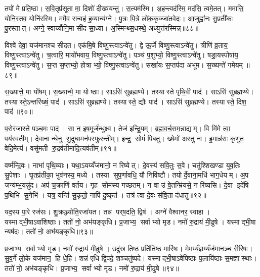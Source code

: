 तपो॑ मे प्रति॒ष्ठा। स॒वि॒तृप्र॑सूता मा॒ दिशो॑ दीख्षयन्तु। स॒त्यम॑स्मि। अ॒हन्त्वद॑स्मि॒ मद॑सि॒ त्वमे॒तत्। ममा॑सि॒ योनि॒स्तव॒ योनि॑रस्मि। ममै॒व सन्वह॑ ह॒व्यान्य॑ग्ने। पु॒त्रः पि॒त्रे लो॑क॒कृज्जा॑तवेदः। आ॒जुह्वा॑नः सु॒प्रती॑कः पु॒रस्तात्। अग्ने॒ स्वाय्योँनि॒मा सी॑द सा॒ध्या। अ॒स्मिन्थ्स॒धस्थे॒ अध्युत्त॑रस्मिन्न्॥८८॥

विश्वे॑ देवा॒ यज॑मानश्च सीदत। एक॑मि॒षे विष्णु॒स्त्वाऽन्वे॑तु। द्वे ऊ॒र्जे विष्णु॒स्त्वाऽन्वे॑तु। त्रीणि॑ व्र॒ताय॒ विष्णु॒स्त्वाऽन्वे॑तु। च॒त्वारि॒ मायो॑भवाय॒ विष्णु॒स्त्वाऽन्वे॑तु। पञ्च॑ प॒शुभ्यो॒ विष्णु॒स्त्वाऽन्वे॑तु। षड्रा॒यस्पोषा॑य॒ विष्णु॒स्त्वाऽन्वे॑तु। स॒प्त स॒प्तभ्यो॒ होत्राभ्यो॒ विष्णु॒स्त्वाऽन्वे॑तु। सखा॑यः स॒प्तप॑दा अभूम। स॒ख्यन्ते॑ गमेयम् ॥८९॥

स॒ख्यात्ते॒ मा यो॑षम्। स॒ख्यान्मे॒ मा योष्ठाः। साऽसि॑ सुब्रह्मण्ये। तस्यास्ते पृथि॒वी पाद॑। साऽसि॑ सुब्रह्मण्ये। तस्यास्ते॒ऽन्तरि॑ख्षं॒ पाद॑। साऽसि॑ सुब्रह्मण्ये। तस्यास्ते॒ द्यौः पाद॑। साऽसि॑ सुब्रह्मण्ये। तस्यास्ते॒ दिश॒ पाद॑॥९०॥

प॒रोर॑जास्ते पञ्च॒मः पाद॑। सा न॒ इष॒मूर्ज॑न्धुक्ष्व। तेज॑ इन्द्रि॒यम्। ब्र॒ह्म॒व॒र्च॒सम॒न्नाद्यम्। वि मि॑मे त्वा॒ पय॑स्वतीम्। दे॒वानान्धे॒नु सु॒दुघा॒मन॑पस्फुरन्तीम्। इन्द्र॒ सोमं॑ पिबतु। ख्षेमो॑ अस्तु नः। इ॒मान्न॑राः कृणुत॒ वेदि॒मेत्य॑। वसु॑मती रु॒द्रव॑तीमादि॒त्यव॑तीम्॥९१॥

वर्ष्म॑न्दि॒वः। नाभा॑ पृथि॒व्याः। यथा॒ऽयय्यँज॑मानो॒ न रिष्येत्। दे॒वस्य॑ सवि॒तुः स॒वे। चतु॑श्शिखण्डा युव॒तिः सु॒पेशाः। घृ॒तप्र॑तीका॒ भुव॑नस्य॒ मध्ये। तस्या सुप॒र्णावधि॒ यौ निवि॑ष्टौ। तयोर्दे॒वाना॒मधि॑ भाग॒धेयम्। अ॒प जन्य॑म्भ॒यन्नु॑द। अप॑ च॒क्राणि॑ वर्तय। गृ॒ह सोम॑स्य गच्छतम्। न वा उ॑ वे॒तन्म्रि॑यसे॒ न रि॑ष्यसि। दे॒वा इदे॑षि प॒थिभि॑ सु॒गेभि॑। यत्र॒ यन्ति॑ सु॒कृतो॒ नापि॑ दु॒ष्कृत॑। तत्र॑ त्वा दे॒वः स॑वि॒ता द॑धातु॥९२॥\anuvakamend[ब्रह्म॑णो॒ योनि॒रह॑सः प॒ङ्क्तिं प्रप॑द्ये दी॒ख्षा यया॑ऽऽदि॒त्यो दी॒ख्षया॑ दीख्षि॒तस्तया त्वा दी॒ख्षया॑ दीख्षया॒म्योष॑धयो दी॒ख्षा द्यौस्त्वा॒ दीख्ष॑माण॒मनु॑ दीख्षता॒मप॑चिति॒श्चाख्षि॑ति॒रुत्त॑रस्मिन्गमेय॒न्दिश॒ पाद॑ आदि॒त्यव॑तीव्वँर्तय॒ पञ्च॑ च]

यद॒स्य पा॒रे रज॑सः। शु॒क्रञ्ज्योति॒रजा॑यत। तन्न॑ पर्‌ष॒दति॒ द्विष॑। अग्ने॑ वैश्वानर॒ स्वाहा। यस्माद्भी॒षाऽवा॑शिष्ठाः। ततो॑ नो॒ अभ॑यङ्कृधि। प्र॒जाभ्य॒ सर्वाभ्यो मृड। नमो॑ रु॒द्राय॑ मी॒ढुषे। यस्माद्भी॒षा न्यष॑दः। ततो॑ नो॒ अभ॑यङ्कृधि॥९३॥

प्र॒जाभ्य॒ सर्वाभ्यो मृड। नमो॑ रु॒द्राय॑ मी॒ढुषे। उदु॑स्र तिष्ठ॒ प्रति॑तिष्ठ॒ मारि॑षः। मेमय्यँ॒ज्ञय्यँज॑मानञ्च रीरिषः। सु॒व॒र्गे लो॒के यज॑मान॒ हि धे॒हि। शन्न॑ एधि द्वि॒पदे॒ शञ्चतु॑ष्पदे। यस्माद्भी॒षाऽवे॑पिष्ठाः प॒लायि॑ष्ठाः स॒मज्ञास्थाः। ततो॑ नो॒ अभ॑यङ्कृधि। प्र॒जाभ्य॒ सर्वाभ्यो मृड। नमो॑ रु॒द्राय॑ मी॒ढुषे॥९४॥

